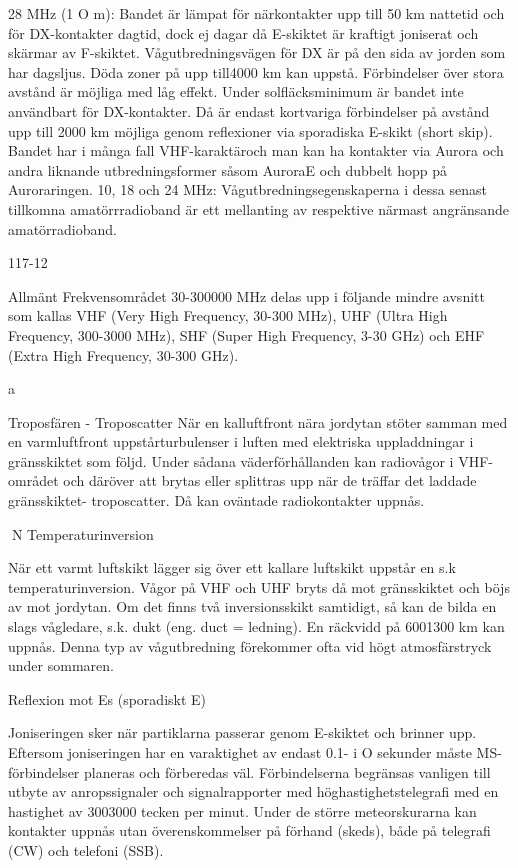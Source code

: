 \documentclass[a4paper,twoside,twocolumn,openright]{book}
\begin{document}
{{{{{28 MHz (1 O m):
Bandet är lämpat för närkontakter upp till 50
km nattetid och för DX-kontakter dagtid,
dock ej dagar då E-skiktet är kraftigt joniserat
och skärmar av F-skiktet. Vågutbredningsvägen för DX är på den sida av jorden som
har dagsljus. Döda zoner på upp till4000 km
kan uppstå. Förbindelser över stora avstånd
är möjliga med låg effekt.
Under solfläcksminimum är bandet inte
användbart för DX-kontakter. Då är endast
kortvariga förbindelser på avstånd upp till
2000 km möjliga genom reflexioner via sporadiska E-skikt (short skip).
Bandet har i många fall VHF-karaktäroch
man kan ha kontakter via Aurora och andra
liknande utbredningsformer såsom AuroraE och dubbelt hopp på Auroraringen.
10, 18 och 24 MHz:
Vågutbredningsegenskaperna i dessa senast tillkomna amatörrradioband är ett mellanting av respektive närmast angränsande
amatörradioband.

117-12

Allmänt
Frekvensområdet 30-300000 MHz delas upp
i följande mindre avsnitt som kallas
VHF (Very High Frequency, 30-300 MHz),
UHF (Ultra High Frequency, 300-3000 MHz),
SHF (Super High Frequency, 3-30 GHz) och
EHF (Extra High Frequency, 30-300 GHz).

a

Troposfären - Troposcatter
När en kalluftfront nära jordytan stöter samman med en varmluftfront uppstårturbulenser
i luften med elektriska uppladdningar i gränsskiktet som följd.
Under sådana väderförhållanden kan
radiovågor i VHF-området och däröver att
brytas eller splittras upp när de träffar det
laddade gränsskiktet- troposcatter. Då kan
oväntade radiokontakter uppnås.

N
Temperaturinversion

När ett varmt luftskikt lägger sig över ett
kallare luftskikt uppstår en s.k temperaturinversion.
Vågor på VHF och UHF bryts då mot
gränsskiktet och böjs av mot jordytan. Om
det finns två inversionsskikt samtidigt, så
kan de bilda en slags vågledare, s.k. dukt
(eng. duct = ledning). En räckvidd på 6001300 km kan uppnås. Denna typ av vågutbredning förekommer ofta vid högt atmosfärstryck under sommaren.

Reflexion mot Es (sporadiskt E)

Joniseringen sker när partiklarna passerar genom E-skiktet och brinner upp. Eftersom joniseringen har en varaktighet av endast 0.1- i O sekunder måste MS-förbindelser planeras och förberedas väl. Förbindelserna begränsas vanligen till utbyte av
anropssignaler och signalrapporter med höghastighetstelegrafi med en hastighet av 3003000 tecken per minut. Under de större meteorskurarna kan kontakter uppnås utan överenskommelser på förhand (skeds), både på
telegrafi (CW) och telefoni (SSB).

}}}}}
\end{document}
